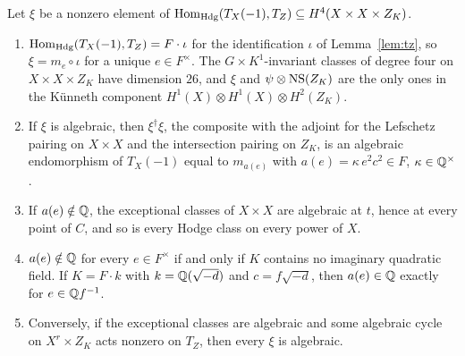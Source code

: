 \begin{theorem}\label{thm:link}
Let $\xi$ be a nonzero element of $\mathrm{Hom}_{\mathrm{Hdg}}(T_{X}(-1),T_{Z})\subseteq H^{4}(X\times X\times Z_{K})$.
\begin{enumerate}[label=\textup{(\roman*)},leftmargin=2.4em,itemsep=2pt]
\item $\mathrm{Hom}_{\mathrm{Hdg}}(T_{X}(-1),T_{Z})=F\cdot\iota$ for the identification $\iota$ of Lemma~\ref{lem:tz}, so $\xi=m_{e}\circ\iota$ for a unique $e\in F^{\times}$. The $G\times K^{1}$-invariant classes of degree four on $X\times X\times Z_{K}$ have dimension $26$, and $\xi$ and $\psi\otimes\mathrm{NS}(Z_{K})$ are the only ones in the K\"unneth component $H^{1}(X)\otimes H^{1}(X)\otimes H^{2}(Z_{K})$.
\item If $\xi$ is algebraic, then $\xi^{\dagger}\xi$, the composite with the adjoint for the Lefschetz pairing on $X\times X$ and the intersection pairing on $Z_{K}$, is an algebraic endomorphism of $T_{X}(-1)$ equal to $m_{a(e)}$ with $a(e)=\kappa\,e^{2}c^{2}\in F$, $\kappa\in\mathbb{Q}^{\times}$.
\item If $a(e)\notin\mathbb{Q}$, the exceptional classes of $X\times X$ are algebraic at $t$, hence at every point of $C$, and so is every Hodge class on every power of $X$.
\item $a(e)\notin\mathbb{Q}$ for every $e\in F^{\times}$ if and only if $K$ contains no imaginary quadratic field. If $K=F\cdot k$ with $k=\mathbb{Q}(\sqrt{-d})$ and $c=f\sqrt{-d}$, then $a(e)\in\mathbb{Q}$ exactly for $e\in\mathbb{Q} f^{-1}$.
\item Conversely, if the exceptional classes are algebraic and some algebraic cycle on $X^{r}\times Z_{K}$ acts nonzero on $T_{Z}$, then every $\xi$ is algebraic.
\end{enumerate}
\end{theorem}


